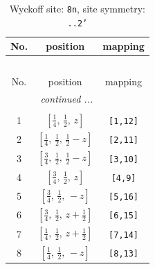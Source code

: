 \documentclass[fleqn,8pt]{jsarticle}
\begin{document}
\begin{longtable}{ccc}
\caption{Wyckoff site: {\tt 8n}, site symmetry: {\tt ..2'}}
 \\
 \hline \hline
No. & position & mapping \\ \hline \endfirsthead

\multicolumn{2}{l}{\tablename\ \thetable{}} \\
 \hline \hline
No. & position & mapping \\ \hline \endhead

 \hline \hline
\multicolumn{2}{r}{\footnotesize\it continued ...} \\ \endfoot

 \hline \hline
\multicolumn{2}{r}{} \\ \endlastfoot

1 & $\left[ \frac{1}{4},\, \frac{1}{2},\, z \right]$ & {\tt [1,12]} \\ \hline
2 & $\left[ \frac{1}{4},\, \frac{1}{2},\, \frac{1}{2} - z \right]$ & {\tt [2,11]} \\ \hline
3 & $\left[ \frac{3}{4},\, \frac{1}{2},\, \frac{1}{2} - z \right]$ & {\tt [3,10]} \\ \hline
4 & $\left[ \frac{3}{4},\, \frac{1}{2},\, z \right]$ & {\tt [4,9]} \\ \hline
5 & $\left[ \frac{3}{4},\, \frac{1}{2},\, - z \right]$ & {\tt [5,16]} \\ \hline
6 & $\left[ \frac{3}{4},\, \frac{1}{2},\, z + \frac{1}{2} \right]$ & {\tt [6,15]} \\ \hline
7 & $\left[ \frac{1}{4},\, \frac{1}{2},\, z + \frac{1}{2} \right]$ & {\tt [7,14]} \\ \hline
8 & $\left[ \frac{1}{4},\, \frac{1}{2},\, - z \right]$ & {\tt [8,13]} \\
\end{longtable}
\renewcommand{\arraystretch}{1.2}
\end{document}
